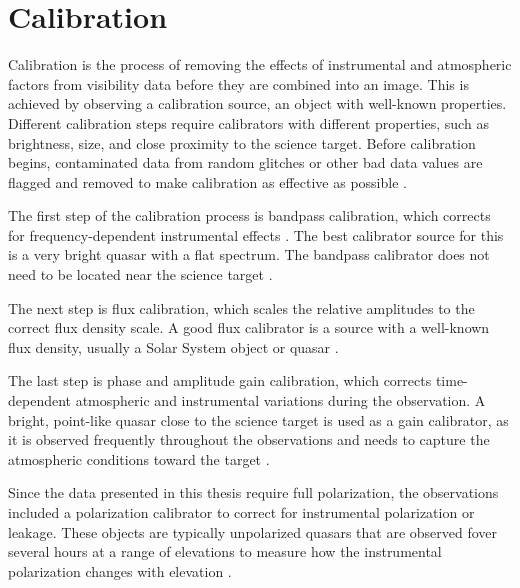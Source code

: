 \section{Calibration}


Calibration is the process of removing the effects of instrumental and atmospheric factors from visibility data before they are combined into an image. This is achieved by observing a calibration source, an object with well-known properties. Different calibration steps require calibrators with different properties, such as brightness, size, and close proximity to the science target. Before calibration begins, contaminated data from random glitches or other bad data values are flagged and removed to make calibration as effective as possible \citep{Thompson}.



The first step of the calibration process is bandpass calibration, which corrects for frequency-dependent instrumental effects \citep{CASA2012,Ricci2017}. The best calibrator source for this is a very bright quasar with a flat spectrum. The bandpass calibrator does not need to be located near the science target \citep{Bendo2026}.


The next step is flux calibration, which scales the relative amplitudes to the correct flux density scale. A good flux calibrator is a source with a well-known flux density, usually a Solar System object or quasar \citep{Ricci2017}.


The last step is phase and amplitude gain calibration, which corrects time-dependent atmospheric and instrumental variations during the observation. A bright, point-like quasar close to the science target is used as a gain calibrator, as it is observed frequently throughout the observations and needs to capture the atmospheric conditions toward the target \citep{Ricci2017}. 




Since the data presented in this thesis require full polarization, the observations included a polarization calibrator to correct for instrumental polarization or leakage. These objects are typically unpolarized quasars that are observed fover several hours at a range of elevations to measure how the instrumental polarization changes with elevation \citep{ALMATechnicalHandbook}.








